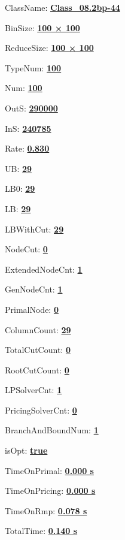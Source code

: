 \documentclass[11pt]{article}
\begin{document}
\pagestyle{empty}


ClassName: \underline{\textbf{Class_08.2bp-44}}
\par
BinSize: \underline{\textbf{100 × 100}}
\par
ReduceSize: \underline{\textbf{100 × 100}}
\par
TypeNum: \underline{\textbf{100}}
\par
Num: \underline{\textbf{100}}
\par
OutS: \underline{\textbf{290000}}
\par
InS: \underline{\textbf{240785}}
\par
Rate: \underline{\textbf{0.830}}
\par
UB: \underline{\textbf{29}}
\par
LB0: \underline{\textbf{29}}
\par
LB: \underline{\textbf{29}}
\par
LBWithCut: \underline{\textbf{29}}
\par
NodeCut: \underline{\textbf{0}}
\par
ExtendedNodeCnt: \underline{\textbf{1}}
\par
GenNodeCnt: \underline{\textbf{1}}
\par
PrimalNode: \underline{\textbf{0}}
\par
ColumnCount: \underline{\textbf{29}}
\par
TotalCutCount: \underline{\textbf{0}}
\par
RootCutCount: \underline{\textbf{0}}
\par
LPSolverCnt: \underline{\textbf{1}}
\par
PricingSolverCnt: \underline{\textbf{0}}
\par
BranchAndBoundNum: \underline{\textbf{1}}
\par
isOpt: \underline{\textbf{true}}
\par
TimeOnPrimal: \underline{\textbf{0.000 s}}
\par
TimeOnPricing: \underline{\textbf{0.000 s}}
\par
TimeOnRmp: \underline{\textbf{0.078 s}}
\par
TotalTime: \underline{\textbf{0.140 s}}
\par
\newpage


\end{document}
